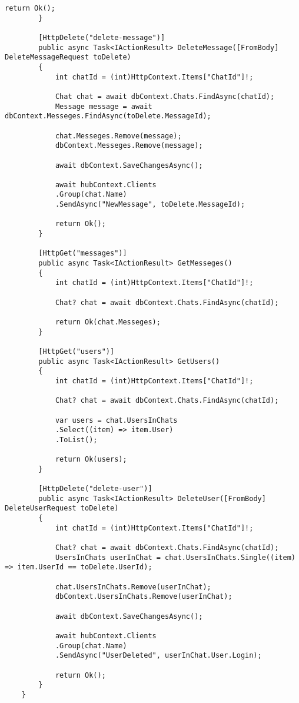 \begin{lstlisting}[style=c#]
			return Ok();
		}
		
		[HttpDelete("delete-message")]
		public async Task<IActionResult> DeleteMessage([FromBody] DeleteMessageRequest toDelete)
		{
			int chatId = (int)HttpContext.Items["ChatId"]!;
			
			Chat chat = await dbContext.Chats.FindAsync(chatId);
			Message message = await dbContext.Messeges.FindAsync(toDelete.MessageId);
			
			chat.Messeges.Remove(message);
			dbContext.Messeges.Remove(message);
			
			await dbContext.SaveChangesAsync();
			
			await hubContext.Clients
			.Group(chat.Name)
			.SendAsync("NewMessage", toDelete.MessageId);
			
			return Ok();
		}
		
		[HttpGet("messages")]
		public async Task<IActionResult> GetMesseges()
		{
			int chatId = (int)HttpContext.Items["ChatId"]!;
			
			Chat? chat = await dbContext.Chats.FindAsync(chatId);
			
			return Ok(chat.Messeges);
		}
		
		[HttpGet("users")]
		public async Task<IActionResult> GetUsers()
		{
			int chatId = (int)HttpContext.Items["ChatId"]!;
			
			Chat? chat = await dbContext.Chats.FindAsync(chatId);
			
			var users = chat.UsersInChats
			.Select((item) => item.User)
			.ToList();
			
			return Ok(users);        
		}
		
		[HttpDelete("delete-user")]
		public async Task<IActionResult> DeleteUser([FromBody] DeleteUserRequest toDelete)
		{
			int chatId = (int)HttpContext.Items["ChatId"]!;
			
			Chat? chat = await dbContext.Chats.FindAsync(chatId);
			UsersInChats userInChat = chat.UsersInChats.Single((item) => item.UserId == toDelete.UserId);
			
			chat.UsersInChats.Remove(userInChat);
			dbContext.UsersInChats.Remove(userInChat);
			
			await dbContext.SaveChangesAsync();
			
			await hubContext.Clients
			.Group(chat.Name)
			.SendAsync("UserDeleted", userInChat.User.Login);
			
			return Ok();
		}
	}
\end{lstlisting}

